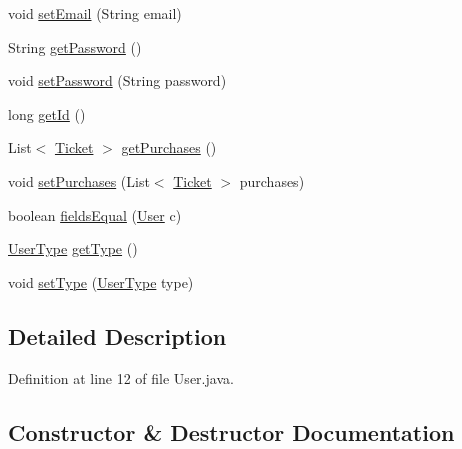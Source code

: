 \begin{DoxyCompactItemize}
void \mbox{\hyperlink{classes_1_1deusto_1_1server_1_1jdo_1_1_user_affc32b9cc71d8e45cb695339b34a2abd}{set\+Email}} (String email)
\item 
String \mbox{\hyperlink{classes_1_1deusto_1_1server_1_1jdo_1_1_user_a1900ee126da22ed0f043e0077e8be049}{get\+Password}} ()
\item 
void \mbox{\hyperlink{classes_1_1deusto_1_1server_1_1jdo_1_1_user_a2e052b5a7cab949f61580edf44bbd233}{set\+Password}} (String password)
\item 
long \mbox{\hyperlink{classes_1_1deusto_1_1server_1_1jdo_1_1_user_ac116b1ec523da06c6776eaa76c910125}{get\+Id}} ()
\item 
List$<$ \mbox{\hyperlink{classes_1_1deusto_1_1server_1_1jdo_1_1_ticket}{Ticket}} $>$ \mbox{\hyperlink{classes_1_1deusto_1_1server_1_1jdo_1_1_user_a320e5da31fb294ff638ff77b0c4f6de4}{get\+Purchases}} ()
\item 
void \mbox{\hyperlink{classes_1_1deusto_1_1server_1_1jdo_1_1_user_a37a375d73be22f96c8fdb5bb69239cfa}{set\+Purchases}} (List$<$ \mbox{\hyperlink{classes_1_1deusto_1_1server_1_1jdo_1_1_ticket}{Ticket}} $>$ purchases)
\item 
boolean \mbox{\hyperlink{classes_1_1deusto_1_1server_1_1jdo_1_1_user_a52fa0dedc394edca2c1d089ec632996b}{fields\+Equal}} (\mbox{\hyperlink{classes_1_1deusto_1_1server_1_1jdo_1_1_user}{User}} c)
\item 
\mbox{\hyperlink{enumes_1_1deusto_1_1server_1_1jdo_1_1_user_type}{User\+Type}} \mbox{\hyperlink{classes_1_1deusto_1_1server_1_1jdo_1_1_user_ac7a47d7d9f3b6212ea22d2fe6b0e8457}{get\+Type}} ()
\item 
void \mbox{\hyperlink{classes_1_1deusto_1_1server_1_1jdo_1_1_user_ac56a41d0180453b832c405cc0d94d170}{set\+Type}} (\mbox{\hyperlink{enumes_1_1deusto_1_1server_1_1jdo_1_1_user_type}{User\+Type}} type)
\end{DoxyCompactItemize}


\subsection{Detailed Description}


Definition at line 12 of file User.\+java.



\subsection{Constructor \& Destructor Documentation}
\mbox{\label{classes_1_1deusto_1_1server_1_1jdo_1_1_user_a3c1d7bfbedde3bad6bed8ccd3288072d}} 
